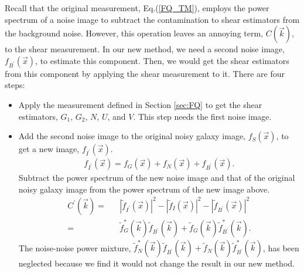 \documentclass[twocolumn]{aastex62}
\begin{document}
Recall that the original measurement, Eq.(\ref{FQ_TM}), employs the power spectrum of a noise image to subtract the contamination to shear estimators from the background noise. However, this operation leaves an annoying term, $C(\vec{k})$, to the shear measurement. In our new method, we need a second noise image, $f_{B^{\prime}}(\vec{x})$, to estimate this component. Then, we would get the shear estimators from this component by applying the shear measurement to it. There are four steps:
\begin{itemize}
	
	\item Apply the measurement defined in Section \ref{sec:FQ} to get the shear estimators, $G_1$, $G_2$, $N$, $U$, and $V$. This step needs the first noise image.

	\item Add the second noise image to the original noisy galaxy image, $f_S(\vec{x})$, to get a new image, $f_{I^{\prime}}(\vec{x})$.
	\begin{eqnarray}
	f_{I^{\prime}}(\vec{x}) = f_G(\vec{x}) + f_N(\vec{x}) + f_{B^{\prime}}(\vec{x}).
	\end{eqnarray}
	Subtract the power spectrum of the new noise image and that of the original noisy galaxy image from the power spectrum of the new image above.
	\begin{eqnarray}
	C^{\prime}(\vec{k})=&&\left\vert \widetilde{f}_{I^{\prime}}(\vec{x})\right\vert^2 - \left\vert \widetilde{f}_{I}(\vec{x})\right\vert^2 - \left\vert \widetilde{f}_{B^{\prime}}(\vec{x})\right\vert^2 \\ \nonumber
	 =&& \widetilde{f}_{G}^{*}(\vec{k})\widetilde{f}_{B^{\prime}}(\vec{k}) + \widetilde{f}_{G}(\vec{k})\widetilde{f}_{B^{\prime}}^{*}(\vec{k}).
	\end{eqnarray}
	The noise-noise power mixture, $\widetilde{f}_{N}^{*}(\vec{k})\widetilde{f}_{B^{\prime}}(\vec{k}) + \widetilde{f}_{N}(\vec{k})\widetilde{f}_{B^{\prime}}^{*}(\vec{k})$, has been neglected because we find it would not change the result in our new method.
	

\end{itemize}
\end{document}
